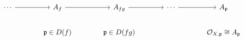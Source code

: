 \[
\begin{tikzcd}[column sep=large]
\cdots \arrow[r] & A_f \arrow[r] & A_{fg} \arrow[r] & \cdots \arrow[r] & A_{\mfp} \\
& \mfp\in D(f) \arrow[u, phantom] & \mfp\in D(fg) \arrow[u, phantom] && \OO_{X,\mfp}\cong A_{\mfp}
\end{tikzcd}
\]
